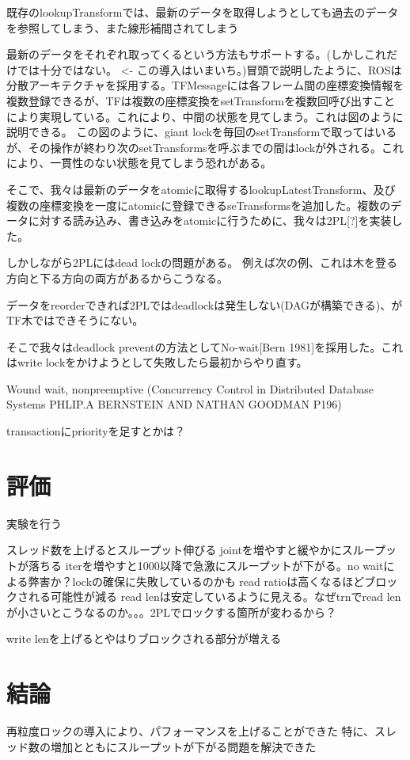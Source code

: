 \documentclass[a4paper]{jreport}	%
\begin{document}
既存のlookupTransformでは、最新のデータを取得しようとしても過去のデータを参照してしまう、また線形補間されてしまう

最新のデータをそれぞれ取ってくるという方法もサポートする。(しかしこれだけでは十分ではない。 <- この導入はいまいち。)冒頭で説明したように、ROSは分散アーキテクチャを採用する。TFMessageには各フレーム間の座標変換情報を複数登録できるが、TFは複数の座標変換をsetTransformを複数回呼び出すことにより実現している。これにより、中間の状態を見てしまう。これは図のように説明できる。
この図のように、giant lockを毎回のsetTransformで取ってはいるが、その操作が終わり次のsetTransformsを呼ぶまでの間はlockが外される。これにより、一貫性のない状態を見てしまう恐れがある。


そこで、我々は最新のデータをatomicに取得するlookupLatestTransform、及び複数の座標変換を一度にatomicに登録できるseTransformsを追加した。複数のデータに対する読み込み、書き込みをatomicに行うために、我々は2PL[?]を実装した。

しかしながら2PLにはdead lockの問題がある。
例えば次の例、これは木を登る方向と下る方向の両方があるからこうなる。

データをreorderできれば2PLではdeadlockは発生しない(DAGが構築できる)、がTF木ではできそうにない。

そこで我々はdeadlock preventの方法としてNo-wait[Bern 1981]を採用した。これはwrite lockをかけようとして失敗したら最初からやり直す。

Wound wait, nonpreemptive (Concurrency Control in Distributed Database Systems PHLIP.A BERNSTEIN AND NATHAN GOODMAN P196)

transactionにpriorityを足すとかは？



\chapter{評価}
実験を行う

スレッド数を上げるとスループット伸びる
jointを増やすと緩やかにスループットが落ちる
iterを増やすと1000以降で急激にスループットが下がる。no waitによる弊害か？lockの確保に失敗しているのかも
read ratioは高くなるほどブロックされる可能性が減る
read lenは安定しているように見える。なぜtrnでread lenが小さいとこうなるのか。。。2PLでロックする箇所が変わるから？

write lenを上げるとやはりブロックされる部分が増える



\chapter{結論}
再粒度ロックの導入により、パフォーマンスを上げることができた
特に、スレッド数の増加とともにスループットが下がる問題を解決できた
\end{document}
